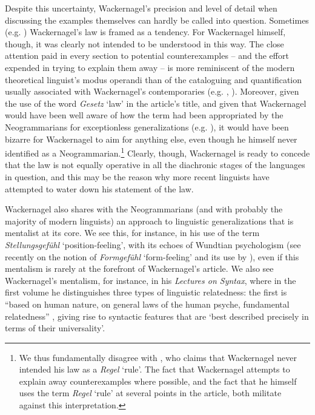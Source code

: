 Despite this uncertainty, Wackernagel's precision and level of detail when discussing the examples themselves can hardly be called into question. Sometimes (e.g. \citealp[24]{HarrisCampbell1995}) Wackernagel's law is framed as a tendency. For Wackernagel himself, though, it was clearly not intended to be understood in this way. The close attention paid in every section to potential counterexamples -- and the effort expended in trying to explain them away -- is more reminiscent of the modern theoretical linguist's modus operandi than of the cataloguing and quantification usually associated with Wackernagel's contemporaries (e.g. \citet{Ries1880}, \citet{Behaghel}). Moreover, given the use of the word \textit{Gesetz} `law' in the article's title, and given that Wackernagel would have been well aware of how the term had been appropriated by the Neogrammarians for exceptionless generalizations (e.g. \citealp{OsthoffBrugmann1878}), it would have been bizarre for Wackernagel to aim for anything else, even though he himself never identified as a Neogrammarian.\footnote{We thus fundamentally disagree with \citet[250--251]{AzizHanna2015}, who claims that Wackernagel never intended his law as a \textit{Regel} `rule'. The fact that Wackernagel attempts to explain away counterexamples where possible, and the fact that he himself uses the term \textit{Regel} `rule' at several points in the article, both militate against this interpretation.} Clearly, though, Wackernagel is ready to concede that the law is not equally operative in all the diachronic stages of the languages in question, and this may be the reason why more recent linguists have attempted to water down his statement of the law.

Wackernagel also shares with the Neogrammarians (and with probably the majority of modern linguists) an approach to linguistic generalizations that is mentalist at its core. We see this, for instance, in his use of the term \textit{Stellungsgefühl} `position-feeling', with its echoes of Wundtian psychologism (see recently \citealp{Fortis2019} on the notion of \textit{Formgefühl} `form-feeling' and its use by \citealp{Wundt1874}), even if this mentalism is rarely at the forefront of Wackernagel's article. We also see Wackernagel's mentalism, for instance, in his \textit{Lectures on Syntax}, where in the first volume he distinguishes three types of linguistic relatedness: the first is ``based on human nature, on general laws of the human psyche, fundamental relatedness'' \citep[11]{Langslow2009}, giving rise to syntactic features that are `best described precisely in terms of their universality'.


